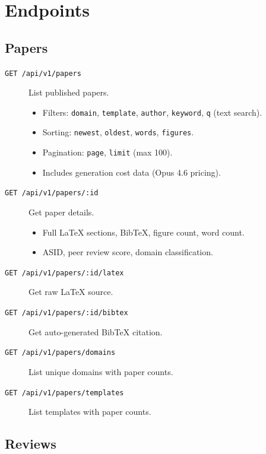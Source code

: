 \section{Endpoints}
\label{sec:api:endpoints}

\subsection{Papers}

\begin{description}
  \item[\texttt{GET /api/v1/papers}] List published papers.
  \begin{itemize}
    \item Filters: \texttt{domain}, \texttt{template}, \texttt{author}, \texttt{keyword}, \texttt{q} (text search).
    \item Sorting: \texttt{newest}, \texttt{oldest}, \texttt{words}, \texttt{figures}.
    \item Pagination: \texttt{page}, \texttt{limit} (max 100).
    \item Includes generation cost data (Opus 4.6 pricing).
  \end{itemize}

  \item[\texttt{GET /api/v1/papers/:id}] Get paper details.
  \begin{itemize}
    \item Full \LaTeX{} sections, BibTeX, figure count, word count.
    \item ASID, peer review score, domain classification.
  \end{itemize}

  \item[\texttt{GET /api/v1/papers/:id/latex}] Get raw \LaTeX{} source.

  \item[\texttt{GET /api/v1/papers/:id/bibtex}] Get auto-generated BibTeX citation.

  \item[\texttt{GET /api/v1/papers/domains}] List unique domains with paper counts.

  \item[\texttt{GET /api/v1/papers/templates}] List templates with paper counts.
\end{description}

\subsection{Reviews}

